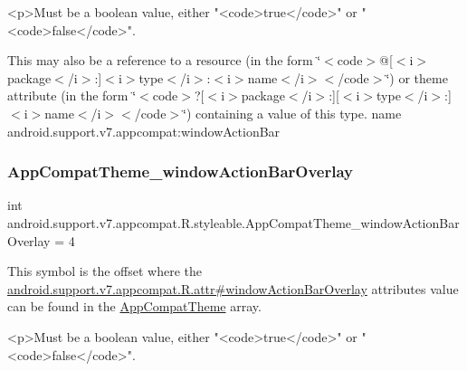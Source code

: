 \begin{DoxyVerb}      <p>Must be a boolean value, either "<code>true</code>" or "<code>false</code>".
\end{DoxyVerb}
 

This may also be a reference to a resource (in the form \char`\"{}$<$code$>$@\mbox{[}$<$i$>$package$<$/i$>$\+:\mbox{]}$<$i$>$type$<$/i$>$\+:$<$i$>$name$<$/i$>$$<$/code$>$\char`\"{}) or theme attribute (in the form \char`\"{}$<$code$>$?\mbox{[}$<$i$>$package$<$/i$>$\+:\mbox{]}\mbox{[}$<$i$>$type$<$/i$>$\+:\mbox{]}$<$i$>$name$<$/i$>$$<$/code$>$\char`\"{}) containing a value of this type.  name android.\+support.\+v7.\+appcompat\+:window\+Action\+Bar \mbox{\label{classandroid_1_1support_1_1v7_1_1appcompat_1_1R_1_1styleable_aabf99bfa0bdf029240c1024f81c0475d}} 
\subsubsection{\texorpdfstring{App\+Compat\+Theme\+\_\+window\+Action\+Bar\+Overlay}{AppCompatTheme\_windowActionBarOverlay}}
{\footnotesize\ttfamily int android.\+support.\+v7.\+appcompat.\+R.\+styleable.\+App\+Compat\+Theme\+\_\+window\+Action\+Bar\+Overlay = 4\hspace{0.3cm}{\ttfamily [static]}}

This symbol is the offset where the \hyperlink{classandroid_1_1support_1_1v7_1_1appcompat_1_1R_1_1attr_a1b21b31c31a8d3a7cef82b24287132a3}{android.\+support.\+v7.\+appcompat.\+R.\+attr\#window\+Action\+Bar\+Overlay} attribute\textquotesingle{}s value can be found in the \hyperlink{classandroid_1_1support_1_1v7_1_1appcompat_1_1R_1_1styleable_a5c42f89e8a410c323be34208d75c430b}{App\+Compat\+Theme} array.

\begin{DoxyVerb}      <p>Must be a boolean value, either "<code>true</code>" or "<code>false</code>".
\end{DoxyVerb}
 

